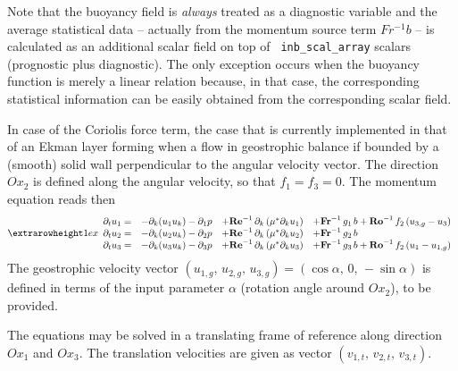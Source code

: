 Note that the buoyancy field is {\it always} treated as a diagnostic variable
and the average statistical data -- actually from the momentum source term
$Fr^{-1}b$ -- is calculated as an additional scalar field on top of {\tt
  inb\_scal\_array} scalars (prognostic plus diagnostic). The only exception
occurs when the buoyancy function is merely a linear relation because, in that
case, the corresponding statistical information can be easily obtained from the
corresponding scalar field.

In case of the Coriolis force term, the case that is currently implemented in
that of an Ekman layer forming when a flow in geostrophic balance if bounded by
a (smooth) solid wall perpendicular to the angular velocity vector. The
direction $Ox_2$ is defined along the angular velocity, so that $f_1=f_3=0$. The
momentum equation reads then
\begin{equation}
\setlength{\extrarowheight}{1ex}
\begin{array}{rlll}
  \partial_t  u_1 =& 
  -\partial_k ( u_1 u_k ) -\partial_1 p &
  +\mathrm{\bf Re}^{-1}\,\partial_k  \left( \mu^{*} \partial_k u_1\right) &
  +\mathrm{\bf Fr}^{-1}\, g_1\,b+\mathrm{\bf Ro}^{-1}\,f_2\,(u_{3,g}-u_3) \\
  \partial_t  u_2 =& 
  -\partial_k ( u_2 u_k ) -\partial_2 p &
  +\mathrm{\bf Re}^{-1}\,\partial_k  \left( \mu^{*} \partial_k u_2\right) &
  +\mathrm{\bf Fr}^{-1}\, g_2\,b \\
  \partial_t  u_3 =& 
  -\partial_k ( u_3 u_k ) -\partial_3 p &
  +\mathrm{\bf Re}^{-1}\,\partial_k  \left( \mu^{*} \partial_k u_3\right) &
  +\mathrm{\bf Fr}^{-1}\, g_3\,b+\mathrm{\bf Ro}^{-1}\,f_2\,(u_1-u_{1,g}) 
\end{array}
\end{equation}
The geostrophic velocity vector $(u_{1,g},\,u_{2,g},\,u_{3,g}) =
(\cos\alpha,\,0,\,-\sin\alpha)$ is defined in terms of the input parameter
$\alpha$ (rotation angle around $Ox_2$), to be provided.

The equations may be solved in a translating frame of reference along direction $Ox_1$ and 
$Ox_3$. The translation velocities are given as vector $(v_{1,t},\,v_{2,t},\,v_{3,t})$. 

